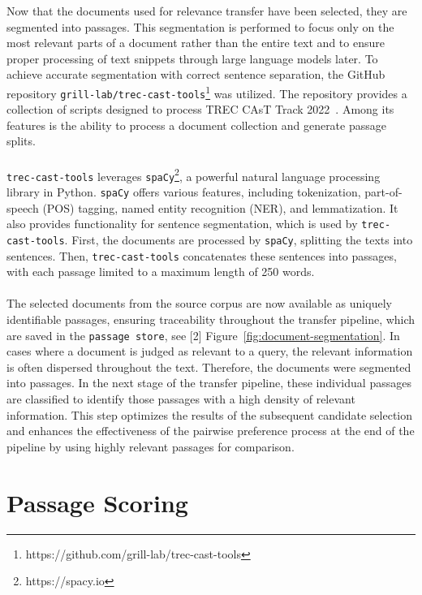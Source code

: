 Now that the documents used for relevance transfer have been selected, they are segmented into passages. This segmentation is performed to focus only on the most relevant parts of a document rather than the entire text and to ensure proper processing of text snippets through large language models later. To achieve accurate segmentation with correct sentence separation, the GitHub repository \texttt{grill-lab/trec-cast-tools}\footnote{https://github.com/grill-lab/trec-cast-tools} was utilized. The repository provides a collection of scripts designed to process TREC CAsT Track 2022~\citep{owoicho:2022}. Among its features is the ability to process a document collection and generate passage splits.
\\\\
\texttt{trec-cast-tools} leverages \texttt{spaCy}\footnote{https://spacy.io}, a powerful natural language processing library in Python. \texttt{spaCy} offers various features, including tokenization, part-of-speech (POS) tagging, named entity recognition (NER), and lemmatization. It also provides functionality for sentence segmentation, which is used by \texttt{trec-cast-tools}. First, the documents are processed by \texttt{spaCy}, splitting the texts into sentences. Then, \texttt{trec-cast-tools} concatenates these sentences into passages, with each passage limited to a maximum length of 250 words.
\\\\    
The selected documents from the source corpus are now available as uniquely identifiable passages, ensuring traceability throughout the transfer pipeline, which are saved in the \texttt{passage store}, see [2] Figure~\ref{fig:document-segmentation}. In cases where a document is judged as relevant to a query, the relevant information is often dispersed throughout the text. Therefore, the documents were segmented into passages. In the next stage of the transfer pipeline, these individual passages are classified to identify those passages with a high density of relevant information. This step optimizes the results of the subsequent candidate selection and enhances the effectiveness of the pairwise preference process at the end of the pipeline by using highly relevant passages for comparison.
\pagebreak


\section{Passage Scoring}\label{passage-scoring}

